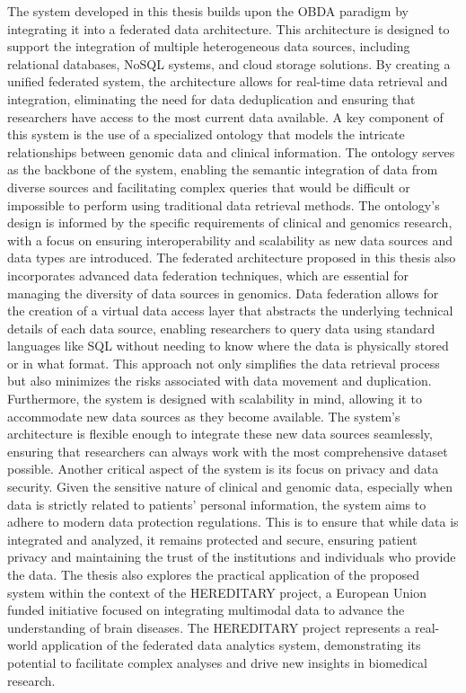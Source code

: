 The system developed in this thesis builds upon the \ac{OBDA} paradigm by integrating it into a federated data architecture. This architecture is designed to support the integration of multiple heterogeneous data sources, including relational databases, NoSQL systems, and cloud storage solutions. By creating a unified federated system, the architecture allows for real-time data retrieval and integration, eliminating the need for data deduplication and ensuring that researchers have access to the most current data available.
A key component of this system is the use of a specialized ontology that models the intricate relationships between genomic data and clinical information. The ontology serves as the backbone of the system, enabling the semantic integration of data from diverse sources and facilitating complex queries that would be difficult or impossible to perform using traditional data retrieval methods. The ontology's design is informed by the specific requirements of clinical and genomics research, with a focus on ensuring interoperability and scalability as new data sources and data types are introduced.
The federated architecture proposed in this thesis also incorporates advanced data federation techniques, which are essential for managing the diversity of data sources in genomics. Data federation allows for the creation of a virtual data access layer that abstracts the underlying technical details of each data source, enabling researchers to query data using standard languages like \ac{SQL} without needing to know where the data is physically stored or in what format. This approach not only simplifies the data retrieval process but also minimizes the risks associated with data movement and duplication.
Furthermore, the system is designed with scalability in mind, allowing it to accommodate new data sources as they become available. The system's architecture is flexible enough to integrate these new data sources seamlessly, ensuring that researchers can always work with the most comprehensive dataset possible.
Another critical aspect of the system is its focus on privacy and data security. Given the sensitive nature of clinical and genomic data, especially when data is strictly related to patients' personal information, the system aims to adhere to modern data protection regulations. This is to ensure that while data is integrated and analyzed, it remains protected and secure, ensuring patient privacy and maintaining the trust of the institutions and individuals who provide the data.
The thesis also explores the practical application of the proposed system within the context of the \ac{HEREDITARY} project, a European Union funded initiative focused on integrating multimodal data to advance the understanding of brain diseases. The \ac{HEREDITARY} project represents a real-world application of the federated data analytics system, demonstrating its potential to facilitate complex analyses and drive new insights in biomedical research.
